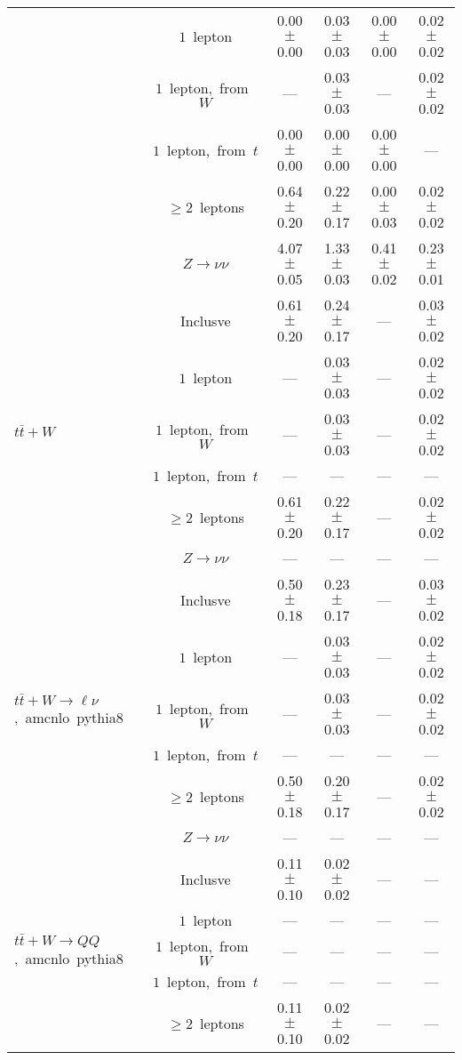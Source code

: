 \documentclass{article}
\begin{document}
\begin{longtable}{|l|c|c|c|c|c|}
 & $1$~lepton  & 0.00 $\pm$ 0.00  & 0.03 $\pm$ 0.03  & 0.00 $\pm$ 0.00  & 0.02 $\pm$ 0.02 \\* 
 & $1$~lepton,~from~$W$  & ---  & 0.03 $\pm$ 0.03  & ---  & 0.02 $\pm$ 0.02 \\* 
 & $1$~lepton,~from~$t$  & 0.00 $\pm$ 0.00  & 0.00 $\pm$ 0.00  & 0.00 $\pm$ 0.00  & --- \\* 
 & $\ge2$~leptons  & 0.64 $\pm$ 0.20  & 0.22 $\pm$ 0.17  & 0.00 $\pm$ 0.03  & 0.02 $\pm$ 0.02 \\* 
 & $Z\rightarrow\nu\nu$  & 4.07 $\pm$ 0.05  & 1.33 $\pm$ 0.03  & 0.41 $\pm$ 0.02  & 0.23 $\pm$ 0.01 \\* 
\hline 
\multirow{6}{*}{$t\bar{t}+W$} & Inclusve  & 0.61 $\pm$ 0.20  & 0.24 $\pm$ 0.17  & ---  & 0.03 $\pm$ 0.02 \\* 
 & $1$~lepton  & ---  & 0.03 $\pm$ 0.03  & ---  & 0.02 $\pm$ 0.02 \\* 
 & $1$~lepton,~from~$W$  & ---  & 0.03 $\pm$ 0.03  & ---  & 0.02 $\pm$ 0.02 \\* 
 & $1$~lepton,~from~$t$  & ---  & ---  & ---  & --- \\* 
 & $\ge2$~leptons  & 0.61 $\pm$ 0.20  & 0.22 $\pm$ 0.17  & ---  & 0.02 $\pm$ 0.02 \\* 
 & $Z\rightarrow\nu\nu$  & ---  & ---  & ---  & --- \\* 
\hline 
\multirow{6}{*}{$t\bar{t}+W{\rightarrow}{\ell}{\nu}$,~amcnlo~pythia8} & Inclusve  & 0.50 $\pm$ 0.18  & 0.23 $\pm$ 0.17  & ---  & 0.03 $\pm$ 0.02 \\* 
 & $1$~lepton  & ---  & 0.03 $\pm$ 0.03  & ---  & 0.02 $\pm$ 0.02 \\* 
 & $1$~lepton,~from~$W$  & ---  & 0.03 $\pm$ 0.03  & ---  & 0.02 $\pm$ 0.02 \\* 
 & $1$~lepton,~from~$t$  & ---  & ---  & ---  & --- \\* 
 & $\ge2$~leptons  & 0.50 $\pm$ 0.18  & 0.20 $\pm$ 0.17  & ---  & 0.02 $\pm$ 0.02 \\* 
 & $Z\rightarrow\nu\nu$  & ---  & ---  & ---  & --- \\* 
\hline 
\multirow{6}{*}{$t\bar{t}+W{\rightarrow}QQ$,~amcnlo~pythia8} & Inclusve  & 0.11 $\pm$ 0.10  & 0.02 $\pm$ 0.02  & ---  & --- \\* 
 & $1$~lepton  & ---  & ---  & ---  & --- \\* 
 & $1$~lepton,~from~$W$  & ---  & ---  & ---  & --- \\* 
 & $1$~lepton,~from~$t$  & ---  & ---  & ---  & --- \\* 
 & $\ge2$~leptons  & 0.11 $\pm$ 0.10  & 0.02 $\pm$ 0.02  & ---  & --- \\* 

\end{longtable}
\end{document}
